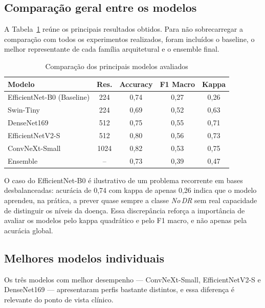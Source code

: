 \documentclass[conference]{IEEEtran}
\begin{document}
\subsection{Compara\c{c}\~ao geral entre os modelos}

A Tabela~\ref{tab:comparacao_modelos} re\'une os principais resultados
obtidos. Para n\~ao sobrecarregar a compara\c{c}\~ao com todos os
experimentos realizados, foram inclu\'idos o baseline, o melhor
representante de cada fam\'ilia arquitetural e o ensemble final.

\begin{table}[htbp]
\caption{Compara\c{c}\~ao dos principais modelos avaliados}
\label{tab:comparacao_modelos}
\centering
\scriptsize
\begin{tabular}{l c c c c}
\hline
\textbf{Modelo} & \textbf{Res.} & \textbf{Accuracy} & \textbf{F1 Macro} & \textbf{Kappa} \\
\hline
EfficientNet-B0 (Baseline) & 224  & 0,74 & 0,27 & 0,26 \\
Swin-Tiny                  & 224  & 0,69 & 0,52 & 0,63 \\
DenseNet169                & 512  & 0,75 & 0,55 & 0,71 \\
EfficientNetV2-S           & 512  & 0,80 & 0,56 & 0,73 \\
ConvNeXt-Small             & 1024 & 0,82 & 0,53 & 0,75 \\
Ensemble                   & --   & 0,73 & 0,39 & 0,47 \\
\hline
\end{tabular}
\end{table}

O caso do EfficientNet-B0 \'e ilustrativo de um problema recorrente em
bases desbalanceadas: acur\'acia de 0,74 com kappa de apenas 0,26
indica que o modelo aprendeu, na pr\'atica, a prever quase sempre a
classe \textit{No\,DR} sem real capacidade de distinguir os n\'iveis da
doen\c{c}a. Essa discrep\^ancia refor\c{c}a a import\^ancia de avaliar
os modelos pelo kappa quadr\'atico e pelo F1 macro, e n\~ao apenas pela
acur\'acia global.

\subsection{Melhores modelos individuais}

Os tr\^es modelos com melhor desempenho --- ConvNeXt-Small,
EfficientNetV2-S e DenseNet169 --- apresentaram perfis bastante
distintos, e essa diferen\c{c}a \'e relevante do ponto de vista
cl\'inico.
\end{document}
